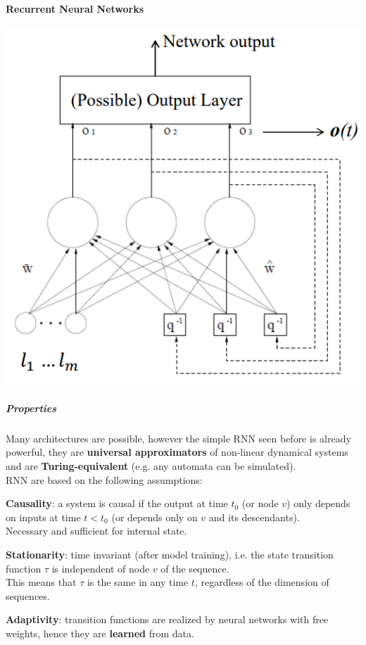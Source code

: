 \documentclass[10pt]{report}
\begin{document}
\paragraph{Recurrent Neural Networks} \begin{center}
	\includegraphics[scale=0.5]{37.png}
\end{center}
\subparagraph{Properties} Many architectures are possible, however the simple RNN seen before is already powerful, they are \textbf{universal approximators} of non-linear dynamical systems and are \textbf{Turing-equivalent} (e.g. any automata can be simulated).\\
RNN are based on the following assumptions:
\begin{list}{}{}
	\item \textbf{Causality}: a system is causal if the output at time $t_0$ (or node $v$) only depends on inputs at time $t<t_0$ (or depends only on $v$ and its descendants).\\
	Necessary and sufficient for internal state.
	\item \textbf{Stationarity}: time invariant (after model training), i.e. the state transition function $\tau$ is independent of node $v$ of the sequence.\\
	This means that $\tau$ is the same in any time $t$, regardless of the dimension of sequences.
	\item \textbf{Adaptivity}: transition functions are realized by neural networks with free weights, hence they are \textbf{learned} from data.
\end{list}
\end{document}

